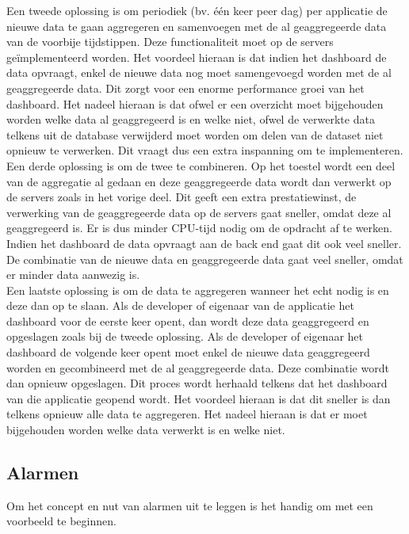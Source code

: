 Een tweede oplossing is om periodiek (bv. \'e\'en keer peer dag) per applicatie de nieuwe data te gaan aggregeren en samenvoegen met de al geaggregeerde data van de voorbije tijdstippen. Deze functionaliteit moet op de servers ge\"implementeerd worden. Het voordeel hieraan is dat indien het dashboard de data opvraagt, enkel de nieuwe data nog moet samengevoegd worden met de al geaggregeerde data. Dit zorgt voor een enorme performance groei van het dashboard. Het nadeel hieraan is dat ofwel er een overzicht moet bijgehouden worden welke data al geaggregeerd is en welke niet, ofwel de verwerkte data telkens uit de database verwijderd moet worden om delen van de dataset niet opnieuw te verwerken. Dit vraagt dus een extra inspanning om te implementeren. \\

Een derde oplossing is om de twee te combineren. Op het toestel wordt een deel van de aggregatie al gedaan en deze geaggregeerde data wordt dan verwerkt op de servers zoals in het vorige deel. Dit geeft een extra prestatiewinst, de verwerking van de geaggregeerde data op de servers gaat sneller, omdat deze al geaggregeerd is. Er is dus minder CPU-tijd nodig om de opdracht af te werken. Indien het dashboard de data opvraagt aan de back end gaat dit ook veel sneller. De combinatie van de nieuwe data en geaggregeerde data gaat veel sneller, omdat er minder data aanwezig is. \\

Een laatste oplossing is om de data te aggregeren wanneer het echt nodig is en deze dan op te slaan. Als de developer of eigenaar van de applicatie het dashboard voor de eerste keer opent, dan wordt deze data geaggregeerd en opgeslagen zoals bij de tweede oplossing. Als de developer of eigenaar het dashboard de volgende keer opent moet enkel de nieuwe data geaggregeerd worden en gecombineerd met de al geaggregeerde data. Deze combinatie wordt dan opnieuw opgeslagen. Dit proces wordt herhaald telkens dat het dashboard van die applicatie geopend wordt. Het voordeel hieraan is dat dit sneller is dan telkens opnieuw alle data te aggregeren. Het nadeel hieraan is dat er moet bijgehouden worden welke data verwerkt is en welke niet. 


\subsection{Alarmen}
Om het concept en nut van alarmen uit te leggen is het handig om met een voorbeeld te beginnen. 

